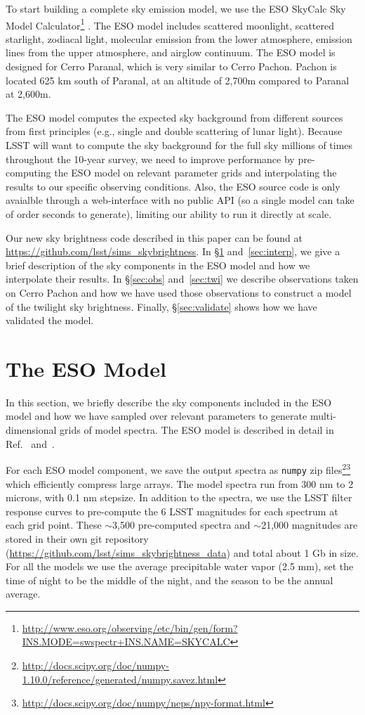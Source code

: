 \documentclass[]{spie}
\begin{document}
To start building a complete sky emission model, we use the ESO SkyCalc Sky Model Calculator\footnote{\url{http://www.eso.org/observing/etc/bin/gen/form?} \url{INS.MODE=swspectr+INS.NAME=SKYCALC}} \cite{Noll12,Jones13}.  The ESO model includes scattered moonlight, scattered starlight, zodiacal light, molecular emission from the lower atmosphere, emission lines from the upper atmosphere, and airglow continuum.  The ESO model is designed for Cerro Paranal, which is very similar to Cerro Pachon.  Pachon is located 625 km south of Paranal, at an altitude of 2,700m compared to Paranal at 2,600m.  

The ESO model computes the expected sky background from different sources from first principles (e.g., single and double scattering of lunar light). Because LSST will want to compute the sky background for the full sky millions of times throughout the 10-year survey, we need to improve performance by pre-computing the ESO model on relevant parameter grids and interpolating the results to our specific observing conditions. Also, the ESO source code is only avaialble through a web-interface with no public API (so a single model can take of order seconds to generate), limiting our ability to run it directly at scale.

Our new sky brightness code described in this paper can be found at \url{https://github.com/lsst/sims\_skybrightness}. In \S\ref{sec:eso} and~\ref{sec:interp}, we give a brief description of the sky components in the ESO model and how we interpolate their results. In \S\ref{sec:obs} and~\ref{sec:twi} we describe observations taken on Cerro Pachon and how we have used those observations to construct a model of the twilight sky brightness.  Finally, \S\ref{sec:validate} shows how we have validated the model.

\section{The ESO Model}\label{sec:eso}

In this section, we briefly describe the sky components included in the ESO model and how we have sampled over relevant parameters to generate multi-dimensional grids of model spectra. The ESO model is described in detail in Ref.~ and~.

For each ESO model component, we save the output spectra as \texttt{numpy} zip files\footnote{\url{http://docs.scipy.org/doc/numpy-1.10.0/reference/generated/numpy.savez.html}}\footnote{\url{http://docs.scipy.org/doc/numpy/neps/npy-format.html}} which efficiently compress large arrays.  The model spectra run from 300 nm to 2 microns, with 0.1 nm stepsize.  In addition to the spectra, we use the LSST filter response curves to pre-compute the 6 LSST magnitudes for each spectrum at each grid point. These $\sim$3,500 pre-computed spectra and $\sim$21,000 magnitudes are stored in their own git repository (\url{https://github.com/lsst/sims\_skybrightness\_data}) and total about 1 Gb in size. For all the models we use the average precipitable water vapor (2.5 mm), set the time of night to be the middle of the night, and the season to be the annual average.
\end{document}
